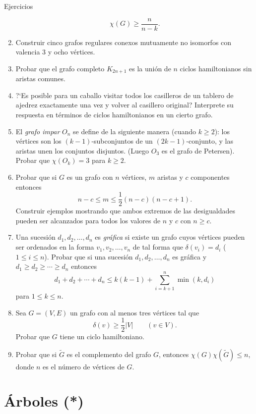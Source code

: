 \documentclass[11pt,spanish,makeidx]{amsbook}
\theoremstyle{definition}
\theoremstyle{remark}
\begin{document}
\begin{section}{Ejercicios}
\begin{enumerate}
$$
\chi(G)\ge \frac{n}{n-k}.
$$
\item Construir cinco grafos regulares conexos mutuamente no isomorfos con valencia 3 y ocho vértices.
\item Probar que el grafo completo $K_{2n+1}$ es la unión de $n$ ciclos hamiltonianos sin aristas comunes.
\item ?`Es posible para un caballo visitar todos los casilleros de un tablero de ajedrez exactamente una vez y volver al casillero original? Interprete su respuesta en términos de ciclos hamiltonianos en un cierto grafo.
\item El {\em grafo impar} $O_n$ se define de la siguiente manera   (cuando $k\ge 2$): los vértices son los $(k-1)$-subconjuntos de un $(2k-1)$-conjunto, y las aristas unen los conjuntos disjuntos. (Luego $O_3$ es el grafo de Petersen). Probar que $\chi(O_k)=3$ para $k\ge 2$.
\item Probar que si $G$ es un grafo con $n$ vértices, $m$ aristas y $c$ componentes entonces
$$
n-c \le m \le \frac12(n-c)(n-c+1).
$$
Construir ejemplos mostrando que ambos extremos de las desigualdades pueden ser alcanzados para todos los valores de $n$ y $c$ con $n\ge c$.
\item Una sucesión $d_1,d_2,\ldots,d_n$ es {\em gráfica} si existe un grafo cuyos vértices pueden ser ordenados en la forma $v_1,v_2,\ldots,v_n$ de tal forma que $\delta(v_i)=d_i$ ($1\le i \le n$). Probar que si una sucesión $d_1,d_2,\ldots,d_n$ es gráfica y $d_1 \ge d_2 \ge \cdots \ge d_n$ entonces
$$
d_1 + d_2 + \cdots + d_n \le k(k-1) + \sum_{i=k+1}^n
\operatorname{min}(k,d_i)
$$
para $1 \le k \le n$.
\item Sea $G=(V,E)$ un grafo con al menos tres vértices tal que
$$
\delta(v) \ge \frac12 |V|\qquad (v\in V).
$$
Probar que $G$ tiene un ciclo hamiltoniano.
\item Probar que si $\tilde G$ es el complemento del grafo $G$, entonces $\chi(G)\chi(\tilde G)\le n$, donde $n$ es el número de vértices
de $G$.
\end{enumerate}

\end{section}

\chapter[Árboles]{Árboles (*)}
\end{document}
